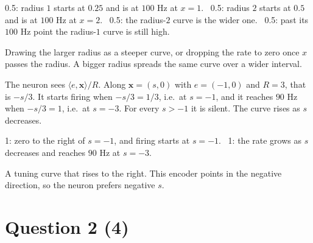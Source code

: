 \documentclass[11pt,letterpaper]{article}
\newcommand{\ans}[1]{\par\vspace{4pt}{\bfseries #1}\quad}
\begin{document}
\begin{marking}
0.5: radius $1$ starts at $0.25$ and is at $100$ Hz at $x = 1$. \ 0.5: radius $2$ starts at $0.5$ and is at $100$ Hz at $x = 2$. \ 0.5: the radius-$2$ curve is the wider one. \ 0.5: past its $100$ Hz point the radius-$1$ curve is still high.
\end{marking}
\begin{trap}
Drawing the larger radius as a steeper curve, or dropping the rate to zero once $x$ passes the radius. A bigger radius spreads the same curve over a wider interval.
\end{trap}

\ans{(b) [2]}
The neuron sees $\langle e, \mathbf x\rangle / R$. Along $\mathbf x = (s, 0)$ with $e = (-1, 0)$ and $R = 3$, that is $-s/3$. It starts firing when $-s/3 = 1/3$, i.e.\ at $s = -1$, and it reaches $90$ Hz when $-s/3 = 1$, i.e.\ at $s = -3$. For every $s > -1$ it is silent. The curve rises as $s$ decreases.
\begin{center}
\end{center}
\begin{marking}
1: zero to the right of $s = -1$, and firing starts at $s = -1$. \ 1: the rate grows as $s$ decreases and reaches $90$ Hz at $s = -3$.
\end{marking}
\begin{trap}
A tuning curve that rises to the right. This encoder points in the negative direction, so the neuron prefers negative $s$.
\end{trap}

\section*{Question 2 \hfill (4)}
\end{document}
